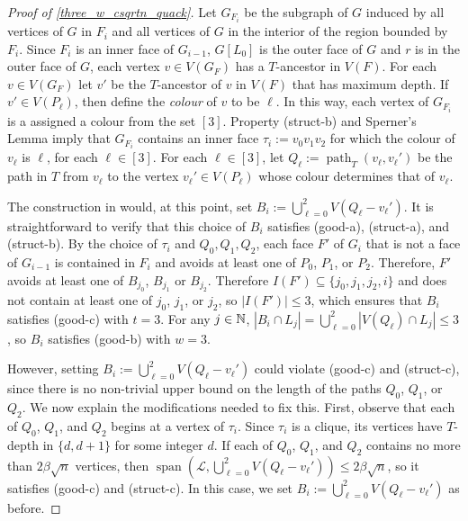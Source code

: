 \documentclass{patmorin}
\newcommand{\defin}[1]{\emph{\textcolor{brightmaroon}{#1}}}
\DeclareMathOperator{\spn}{span}
\DeclareMathOperator{\pth}{path}
\begin{document}
\begin{proof}[Proof of \cref{three_w_csqrtn_quack}]
  Let $G_{F_i}$ be the subgraph of $G$ induced by all vertices of $G$ in $F_i$ and all vertices of $G$ in the interior of the region bounded by $F_i$.  Since $F_i$ is an inner face of $G_{i-1}$, $G[L_0]$ is the outer face of $G$ and $r$ is in the outer face of $G$, each vertex $v\in V(G_F)$ has a $T$-ancestor in $V(F)$.  For each $v\in V(G_F)$ let $v'$ be the $T$-ancestor of $v$ in $V(F)$ that has maximum depth.  If $v'\in V(P_\ell)$, then define the \defin{colour} of $v$ to be $\ell$.  In this way, each vertex of $G_{F_i}$ is a assigned a colour from the set $[3]$.  Property (struct-b) and Sperner's Lemma imply that $G_{F_i}$ contains an inner face $\tau_i:=v_0v_1v_2$ for which the colour of $v_\ell$ is $\ell$, for each $\ell\in[3]$.  For each $\ell\in[3]$, let $Q_\ell:=\pth_T(v_\ell,v_\ell')$ be the path in $T$ from $v_\ell$ to the vertex $v_{\ell}'\in V(P_{\ell})$ whose colour determines that of $v_\ell$.

  The construction in \citet{dujmovic.joret.ea:planar} would, at this point, set $B_i:=\bigcup_{\ell=0}^2 V(Q_\ell-v_\ell')$.
  It is straightforward to verify that this choice of $B_i$ satisfies (good-a), (struct-a), and (struct-b).  By the choice of $\tau_i$ and $Q_0,Q_1,Q_2$, each face $F'$ of $G_i$ that is not a face of $G_{i-1}$ is contained in $F_i$ and avoids at least one of $P_0$, $P_1$, or $P_2$. Therefore, $F'$ avoids at least one of $B_{j_0}$, $B_{j_1}$ or $B_{j_2}$. Therefore $I(F')\subseteq \{j_0,j_1,j_2,i\}$ and does not contain at least one of $j_0$, $j_1$, or $j_2$, so $|I(F')|\le 3$, which ensures that $B_i$ satisfies (good-c) with $t=3$.  For any $j\in\mathbb{N}$, $|B_i\cap L_j|=\bigcup_{\ell=0}^2|V(Q_\ell)\cap L_j|\le 3$, so $B_i$ satisfies (good-b) with $w=3$.

  However, setting $B_i:=\bigcup_{\ell=0}^2 V(Q_\ell-v_\ell')$ could violate (good-c) and (struct-c), since there is no non-trivial upper bound on the length of the paths $Q_0$, $Q_1$, or $Q_2$.  We now explain the modifications needed to fix this.  First, observe that each of $Q_0$, $Q_1$, and $Q_2$ begins at a vertex of $\tau_i$.  Since $\tau_i$ is a clique, its vertices have $T$-depth in $\{d,d+1\}$ for some integer $d$. If each of $Q_0$, $Q_1$, and $Q_2$ contains no more than $2\beta\sqrt{n}$ vertices, then $\spn(\mathcal{L},\bigcup_{\ell=0}^2 V(Q_\ell-v_\ell'))\le 2\beta\sqrt{n}$, so it satisfies (good-c) and (struct-c). In this case, we set $B_i:=\bigcup_{\ell=0}^2 V(Q_\ell-v_\ell')$ as before.


\end{proof}
\end{document}
